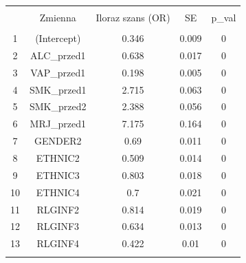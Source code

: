 
\begin{tabular}{@{\extracolsep{5pt}} ccccc} 
\\[-1.8ex]\hline 
\hline \\[-1.8ex] 
 & Zmienna & Iloraz szans (OR) & SE & p\_val \\ 
\hline \\[-1.8ex] 
1 & (Intercept) & 0.346 & 0.009 & 0 \\ 
2 & ALC\_przed1 & 0.638 & 0.017 & 0 \\ 
3 & VAP\_przed1 & 0.198 & 0.005 & 0 \\ 
4 & SMK\_przed1 & 2.715 & 0.063 & 0 \\ 
5 & SMK\_przed2 & 2.388 & 0.056 & 0 \\ 
6 & MRJ\_przed1 & 7.175 & 0.164 & 0 \\ 
7 & GENDER2 & 0.69 & 0.011 & 0 \\ 
8 & ETHNIC2 & 0.509 & 0.014 & 0 \\ 
9 & ETHNIC3 & 0.803 & 0.018 & 0 \\ 
10 & ETHNIC4 & 0.7 & 0.021 & 0 \\ 
11 & RLGINF2 & 0.814 & 0.019 & 0 \\ 
12 & RLGINF3 & 0.634 & 0.013 & 0 \\ 
13 & RLGINF4 & 0.422 & 0.01 & 0 \\ 
\hline \\[-1.8ex] 
\end{tabular} 
